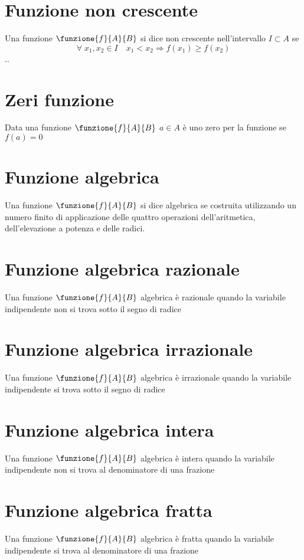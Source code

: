 \section{Funzione non crescente}
Una funzione $\funzione{f}{A}{B}$ si dice non crescente nell'intervallo  $I\subset A$ se
\begin{equation*}
\forall\; x_1,x_2\in I\quad x_1< x_2\Longrightarrow f(x_1)\geq f(x_2)
\end{equation*}
..\section{Zeri funzione}
Data una funzione $\funzione{f}{A}{B}$ $a\in A$ è uno zero per la funzione se $f(a)=0$
\section{Funzione algebrica}
Una funzione $\funzione{f}{A}{B}$ si dice algebrica se costruita utilizzando un numero finito di applicazione delle quattro operazioni dell'aritmetica, dell'elevazione a potenza e delle radici. 
\section{Funzione algebrica razionale}
Una funzione $\funzione{f}{A}{B}$ algebrica è razionale quando la variabile indipendente non si trova sotto il segno di radice
\section{Funzione algebrica irrazionale}
Una funzione $\funzione{f}{A}{B}$ algebrica è irrazionale quando la variabile indipendente  si trova sotto il segno di radice 
\section{Funzione algebrica intera}
Una funzione $\funzione{f}{A}{B}$ algebrica è intera quando la variabile indipendente non si trova al denominatore di una frazione
\section{Funzione algebrica fratta}
Una funzione $\funzione{f}{A}{B}$ algebrica è fratta quando la variabile indipendente si trova al denominatore di una frazione	
